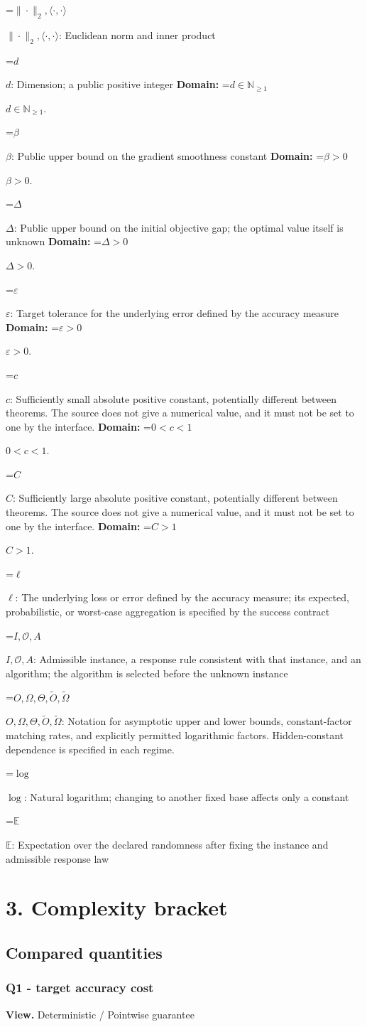 \documentclass[10pt,a4paper]{article}
\newcommand{\AtlasMath}[1]{\par\begingroup\centering\setbox0=\hbox{$\displaystyle #1$}\ifdim\wd0>1.4\linewidth\typeout{ATLAS WIDE FORMULA: \the\wd0}\fi\ifdim\wd0>\linewidth\resizebox{\linewidth}{!}{\box0}\else\box0\fi\par\endgroup}
\newcommand{\AtlasInlineMath}[1]{\begingroup\setbox0=\hbox{$#1$}\ifdim\wd0>.4\linewidth\endgroup\AtlasMath{#1}\else\endgroup$#1$\fi}
\begin{document}
\AtlasInlineMath{\|\cdot\|_2,\langle\cdot,\cdot\rangle}: Euclidean norm and inner product

\AtlasInlineMath{d}: Dimension; a public positive integer \textbf{Domain:} \AtlasInlineMath{d\in\mathbb{N}_{\ge1}}.

\AtlasInlineMath{\beta}: Public upper bound on the gradient smoothness constant \textbf{Domain:} \AtlasInlineMath{\beta>0}.

\AtlasInlineMath{\Delta}: Public upper bound on the initial objective gap; the optimal value itself is unknown \textbf{Domain:} \AtlasInlineMath{\Delta>0}.

\AtlasInlineMath{\varepsilon}: Target tolerance for the underlying error defined by the accuracy measure \textbf{Domain:} \AtlasInlineMath{\varepsilon>0}.

\AtlasInlineMath{c}: Sufficiently small absolute positive constant, potentially different between theorems. The source does not give a numerical value, and it must not be set to one by the interface. \textbf{Domain:} \AtlasInlineMath{0<c<1}.

\AtlasInlineMath{C}: Sufficiently large absolute positive constant, potentially different between theorems. The source does not give a numerical value, and it must not be set to one by the interface. \textbf{Domain:} \AtlasInlineMath{C>1}.

\AtlasInlineMath{\ell}: The underlying loss or error defined by the accuracy measure; its expected, probabilistic, or worst-case aggregation is specified by the success contract

\AtlasInlineMath{I,\mathcal{O},A}: Admissible instance, a response rule consistent with that instance, and an algorithm; the algorithm is selected before the unknown instance

\AtlasInlineMath{O,\Omega,\Theta,\widetilde{O},\widetilde\Omega}: Notation for asymptotic upper and lower bounds, constant-factor matching rates, and explicitly permitted logarithmic factors. Hidden-constant dependence is specified in each regime.

\AtlasInlineMath{\log}: Natural logarithm; changing to another fixed base affects only a constant

\AtlasInlineMath{\mathbb{E}}: Expectation over the declared randomness after fixing the instance and admissible response law

\section{3. Complexity bracket}
\subsection{Compared quantities}
\subsubsection{Q1 - target accuracy cost}
\textbf{View.} Deterministic / Pointwise guarantee
\end{document}
